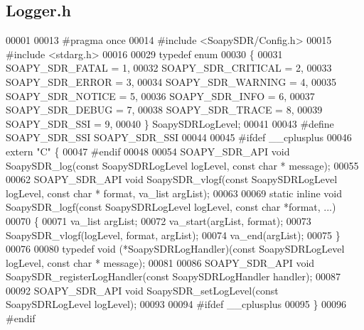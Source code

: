 \subsection{Logger.\+h}
\label{soapysdr_2include_2SoapySDR_2Logger_8h_source}

\begin{DoxyCode}
00001 
00013 \textcolor{preprocessor}{#pragma once}
00014 \textcolor{preprocessor}{#include <SoapySDR/Config.h>}
00015 \textcolor{preprocessor}{#include <stdarg.h>}
00016 
00029 \textcolor{keyword}{typedef} \textcolor{keyword}{enum}
00030 \{
00031     SOAPY_SDR_FATAL    = 1, 
00032     SOAPY_SDR_CRITICAL = 2, 
00033     SOAPY_SDR_ERROR    = 3, 
00034     SOAPY_SDR_WARNING  = 4, 
00035     SOAPY_SDR_NOTICE   = 5, 
00036     SOAPY_SDR_INFO     = 6, 
00037     SOAPY_SDR_DEBUG    = 7, 
00038     SOAPY_SDR_TRACE    = 8, 
00039     SOAPY_SDR_SSI      = 9, 
00040 \} SoapySDRLogLevel;
00041 
00043 \textcolor{preprocessor}{#define SOAPY\_SDR\_SSI SOAPY\_SDR\_SSI}
00044 
00045 \textcolor{preprocessor}{#ifdef \_\_cplusplus}
00046 \textcolor{keyword}{extern} \textcolor{stringliteral}{"C"} \{
00047 \textcolor{preprocessor}{#endif}
00048 
00054 SOAPY_SDR_API \textcolor{keywordtype}{void} SoapySDR_log(\textcolor{keyword}{const} SoapySDRLogLevel logLevel, \textcolor{keyword}{const} \textcolor{keywordtype}{char} *
      message);
00055 
00062 SOAPY_SDR_API \textcolor{keywordtype}{void} SoapySDR_vlogf(\textcolor{keyword}{const} SoapySDRLogLevel logLevel, \textcolor{keyword}{const} \textcolor{keywordtype}{char} *
      format, va\_list argList);
00063 
00069 \textcolor{keyword}{static} \textcolor{keyword}{inline} \textcolor{keywordtype}{void} SoapySDR_logf(\textcolor{keyword}{const} SoapySDRLogLevel logLevel, \textcolor{keyword}{const} \textcolor{keywordtype}{char} *format, ...)
00070 \{
00071     va\_list argList;
00072     va\_start(argList, format);
00073     SoapySDR_vlogf(logLevel, format, argList);
00074     va\_end(argList);
00075 \}
00076 
00080 \textcolor{keyword}{typedef} void (*SoapySDRLogHandler)(\textcolor{keyword}{const} SoapySDRLogLevel logLevel, \textcolor{keyword}{const} \textcolor{keywordtype}{char} *
      message);
00081 
00086 SOAPY_SDR_API \textcolor{keywordtype}{void} SoapySDR_registerLogHandler(\textcolor{keyword}{const} SoapySDRLogHandler handler);
00087 
00092 SOAPY_SDR_API \textcolor{keywordtype}{void} SoapySDR_setLogLevel(\textcolor{keyword}{const} SoapySDRLogLevel logLevel);
00093 
00094 \textcolor{preprocessor}{#ifdef \_\_cplusplus}
00095 \}
00096 \textcolor{preprocessor}{#endif}
\end{DoxyCode}
